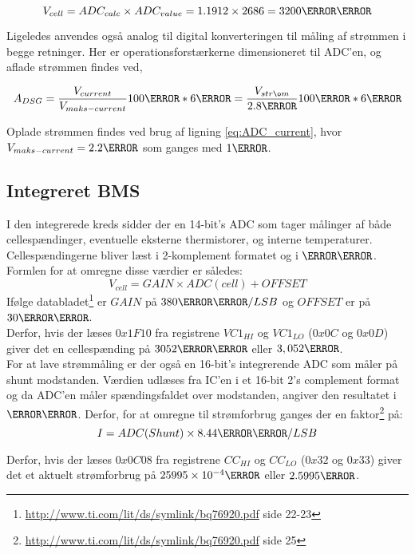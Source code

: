\begin {equation}
V_{cell} = ADC_{calc} \times ADC_{value} = 1.1912 \times 2686 = 3200\milli\volt 
\label{eq:V_cell}
\end {equation}

Ligeledes anvendes også analog til digital konverteringen til måling af strømmen i begge retninger. Her er operationsforstærkerne dimensioneret til ADC'en, og aflade strømmen findes ved,

\begin {equation}
A_{DSG} =  \frac{V_{current}}{V_{maks-current}} 100\percent * 6\ampere =  \frac{V_{strøm}}{2.8\volt} 100\percent * 6\ampere \label{eq:ADC_current}
\end {equation}

Oplade strømmen findes ved brug af ligning \ref{eq:ADC_current}, hvor $V_{maks-current} = 2.2\volt$ som ganges med $1\ampere$.

\subsection{Integreret BMS}
I den integrerede kreds sidder der en 14-bit's ADC som tager målinger af både cellespændinger, eventuelle eksterne thermistorer, og interne temperaturer. Cellespændingerne bliver læst i 2-komplement formatet og i $\milli\volt$. Formlen for at omregne disse værdier er således: 
\begin {equation} 
V_{cell} = GAIN \times ADC(cell) + OFFSET
\end {equation}
Ifølge databladet\footnote{\url{http://www.ti.com/lit/ds/symlink/bq76920.pdf} side 22-23} er $GAIN$ på $380\micro\volt/LSB$ og $OFFSET$ er på $30\milli\volt$. \\

Derfor, hvis der læses $0x1F10$ fra registrene $VC1_{HI}$ og $VC1_{LO}$ ($0x0C$ og $0x0D$) giver det en cellespænding på $3052\milli\volt$ eller $3,052\volt$.\\

For at lave strømmåling er der også en 16-bit's integrerende ADC som måler på shunt modstanden. Værdien udlæses fra IC'en i et 16-bit 2's complement format og da ADC'en måler spændingsfaldet over modstanden, angiver den resultatet i $\micro\volt$. Derfor, for at omregne til strømforbrug ganges der en faktor\footnote{\url{http://www.ti.com/lit/ds/symlink/bq76920.pdf} side 25} på: 
\begin {equation} 
I = ADC(Shunt) \times 8.44\micro\volt/LSB
\end {equation}

Derfor, hvis der læses $0x0C08$ fra registrene $CC_{HI}$ og $CC_{LO}$ ($0x32$ og $0x33$) giver det et aktuelt strømforbrug på $25995\times10^{-4}\ampere$ eller $2.5995\ampere$.